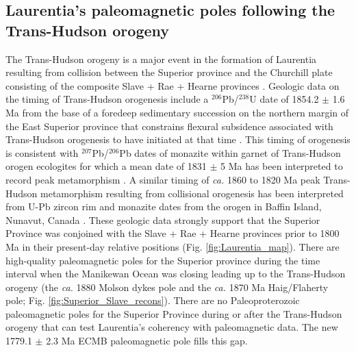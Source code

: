 \documentclass[draft]{agujournal2019}
\begin{document}
\subsection{Laurentia's paleomagnetic poles following the Trans-Hudson orogeny}

The Trans-Hudson orogeny is a major event in the formation of Laurentia resulting from collision between the Superior province and the Churchill plate consisting of the composite Slave + Rae + Hearne provinces \cite{Hoffman1988a, Corrigan2009a, Weller2017a}. Geologic data on the timing of Trans-Hudson orogenesis include a $^{206}$Pb/$^{238}$U date of 1854.2 $\pm$ 1.6 Ma from the base of a foredeep sedimentary succession on the northern margin of the East Superior province that constrains flexural subsidence associated with Trans-Hudson orogenesis to have initiated at that time \cite{Hodgskiss2019a}. This timing of orogenesis is consistent with $^{207}$Pb/$^{206}$Pb dates of monazite within garnet of Trans-Hudson orogen ecologites for which a mean date of 1831 $\pm$ 5 Ma has been interpreted to record peak metamorphism \cite{Weller2017a}. A similar timing of \textit{ca.} 1860 to 1820 Ma peak Trans-Hudson metamorphism resulting from collisional orogenesis has been interpreted from U-Pb zircon rim and monazite dates from the orogen in Baffin Island, Nunavut, Canada \cite{Skipton2016a}. These geologic data strongly support that the Superior Province was conjoined with the Slave + Rae + Hearne provinces prior to 1800 Ma in their present-day relative positions (Fig. \ref{fig:Laurentia_map}). There are high-quality paleomagnetic poles for the Superior province during the time interval when the Manikewan Ocean was closing leading up to the Trans-Hudson orogeny (the \textit{ca.} 1880 Molson dykes pole and the \textit{ca.} 1870 Ma Haig/Flaherty pole; Fig. \ref{fig:Superior_Slave_recons}). There are no Paleoproterozoic paleomagnetic poles for the Superior Province during or after the Trans-Hudson orogeny that can test Laurentia's coherency with paleomagnetic data. The new 1779.1 $\pm$ 2.3 Ma ECMB paleomagnetic pole fills this gap.
\end{document}
